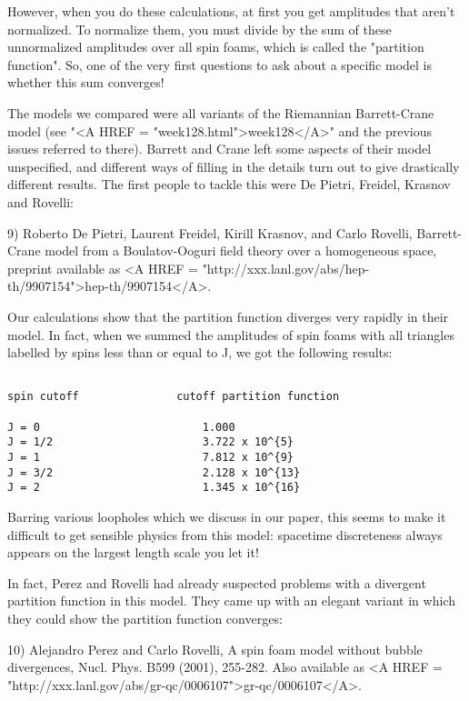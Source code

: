 However, when you do these calculations, at first you get amplitudes
that aren't normalized.  To normalize them, you must divide by the sum
of these unnormalized amplitudes over all spin foams, which is called
the "partition function".  So, one of the very first questions to ask
about a specific model is whether this sum converges!

The models we compared were all variants of the Riemannian Barrett-Crane
model (see "<A HREF = "week128.html">week128</A>" and the
previous issues referred to there).  Barrett and Crane left some aspects
of their model unspecified, and different ways of filling in the details
turn out to give drastically different results.  The first people to
tackle this were De Pietri, Freidel, Krasnov and Rovelli:

9) Roberto De Pietri, Laurent Freidel, Kirill Krasnov, and Carlo
Rovelli, Barrett-Crane model from a Boulatov-Ooguri field theory over 
a homogeneous space, preprint available as <A HREF = "http://xxx.lanl.gov/abs/hep-th/9907154">hep-th/9907154</A>. 

Our calculations show that the partition function diverges very rapidly 
in their model.  In fact, when we summed the amplitudes of spin foams
with all triangles labelled by spins less than or equal to J, 
we got the following results:


\begin{verbatim}

spin cutoff               cutoff partition function 

J = 0                         1.000 
J = 1/2                       3.722 x 10^{5}
J = 1                         7.812 x 10^{9}
J = 3/2                       2.128 x 10^{13}
J = 2                         1.345 x 10^{16}
\end{verbatim}
    
Barring various loopholes which we discuss in our paper, this seems
to make it difficult to get sensible physics from this model: spacetime
discreteness always appears on the largest length scale you let it!

In fact, Perez and Rovelli had already suspected problems with a divergent
partition function in this model.  They came up with an elegant variant
in which they could show the partition function converges:

10) Alejandro Perez and Carlo Rovelli, A spin foam model without bubble
divergences, Nucl. Phys. B599 (2001), 255-282.  Also available as
<A HREF = "http://xxx.lanl.gov/abs/gr-qc/0006107">gr-qc/0006107</A>. 

